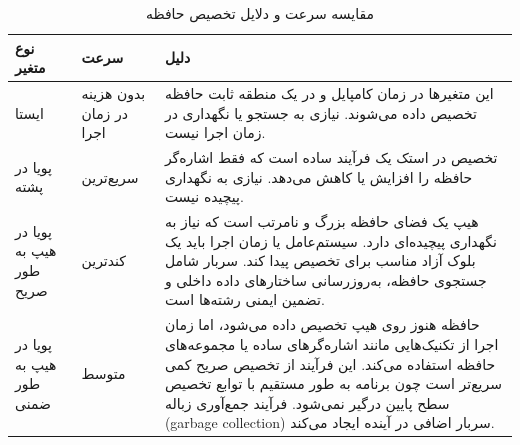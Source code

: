 \documentclass{article}
\begin{document}
\begin{table}[h!]
    \centering
    \begin{tabular}{|p{4cm}|p{3cm}|p{7cm}|}
        \hline
        \textbf{نوع متغیر} & \textbf{سرعت} & \textbf{دلیل} \\
        \hline
        ایستا &
        بدون هزینه در زمان اجرا &
        این متغیرها در زمان کامپایل و در یک منطقه ثابت حافظه تخصیص داده می‌شوند. نیازی به جستجو یا نگهداری در زمان اجرا نیست. \\
        \hline
        پویا در پشته &
        سریع‌ترین &
        تخصیص در استک یک فرآیند ساده است که فقط اشاره‌گر حافظه را افزایش یا کاهش می‌دهد. نیازی به نگهداری پیچیده نیست. \\
        \hline
        پویا در هیپ به طور صریح &
        کندترین &
        هیپ یک فضای حافظه بزرگ و نامرتب است که نیاز به نگهداری پیچیده‌ای دارد. سیستم‌عامل یا زمان اجرا باید یک بلوک آزاد مناسب برای تخصیص پیدا کند. سربار شامل جستجوی حافظه، به‌روزرسانی ساختارهای داده داخلی و تضمین ایمنی رشته‌ها است. \\
        \hline
        پویا در هیپ به طور ضمنی &
        متوسط &
        حافظه هنوز روی هیپ تخصیص داده می‌شود، اما زمان اجرا از تکنیک‌هایی مانند اشاره‌گرهای ساده یا مجموعه‌های حافظه استفاده می‌کند. این فرآیند از تخصیص صریح کمی سریع‌تر است چون برنامه به طور مستقیم با توابع تخصیص سطح پایین درگیر نمی‌شود. فرآیند جمع‌آوری زباله (garbage collection) سربار اضافی در آینده ایجاد می‌کند. \\
        \hline
    \end{tabular}
    \caption{مقایسه سرعت و دلایل تخصیص حافظه}
    \label{tab:memory_speed}
\end{table}
\end{document}
